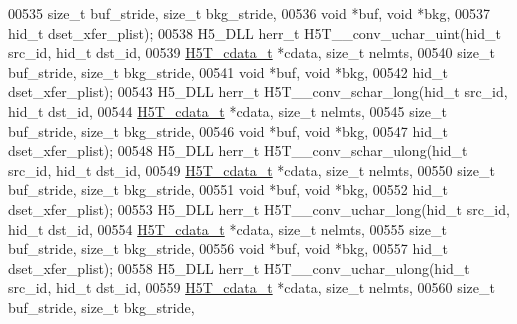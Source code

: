 \begin{DoxyCode}
00535                   \textcolor{keywordtype}{size\_t} buf\_stride, \textcolor{keywordtype}{size\_t} bkg\_stride,
00536                                   \textcolor{keywordtype}{void} *buf, \textcolor{keywordtype}{void} *bkg,
00537                                   hid\_t dset\_xfer\_plist);
00538 H5\_DLL herr\_t H5T\_\_conv\_uchar\_uint(hid\_t src\_id, hid\_t dst\_id,
00539                    \hyperlink{struct_h5_t__cdata__t}{H5T\_cdata\_t} *cdata, \textcolor{keywordtype}{size\_t} nelmts,
00540                    \textcolor{keywordtype}{size\_t} buf\_stride, \textcolor{keywordtype}{size\_t} bkg\_stride,
00541                                    \textcolor{keywordtype}{void} *buf, \textcolor{keywordtype}{void} *bkg,
00542                                    hid\_t dset\_xfer\_plist);
00543 H5\_DLL herr\_t H5T\_\_conv\_schar\_long(hid\_t src\_id, hid\_t dst\_id,
00544                    \hyperlink{struct_h5_t__cdata__t}{H5T\_cdata\_t} *cdata, \textcolor{keywordtype}{size\_t} nelmts,
00545                    \textcolor{keywordtype}{size\_t} buf\_stride, \textcolor{keywordtype}{size\_t} bkg\_stride,
00546                                    \textcolor{keywordtype}{void} *buf, \textcolor{keywordtype}{void} *bkg,
00547                                    hid\_t dset\_xfer\_plist);
00548 H5\_DLL herr\_t H5T\_\_conv\_schar\_ulong(hid\_t src\_id, hid\_t dst\_id,
00549                     \hyperlink{struct_h5_t__cdata__t}{H5T\_cdata\_t} *cdata, \textcolor{keywordtype}{size\_t} nelmts,
00550                     \textcolor{keywordtype}{size\_t} buf\_stride, \textcolor{keywordtype}{size\_t} bkg\_stride,
00551                                     \textcolor{keywordtype}{void} *buf, \textcolor{keywordtype}{void} *bkg,
00552                                     hid\_t dset\_xfer\_plist);
00553 H5\_DLL herr\_t H5T\_\_conv\_uchar\_long(hid\_t src\_id, hid\_t dst\_id,
00554                    \hyperlink{struct_h5_t__cdata__t}{H5T\_cdata\_t} *cdata, \textcolor{keywordtype}{size\_t} nelmts,
00555                    \textcolor{keywordtype}{size\_t} buf\_stride, \textcolor{keywordtype}{size\_t} bkg\_stride,
00556                                    \textcolor{keywordtype}{void} *buf, \textcolor{keywordtype}{void} *bkg,
00557                                    hid\_t dset\_xfer\_plist);
00558 H5\_DLL herr\_t H5T\_\_conv\_uchar\_ulong(hid\_t src\_id, hid\_t dst\_id,
00559                     \hyperlink{struct_h5_t__cdata__t}{H5T\_cdata\_t} *cdata, \textcolor{keywordtype}{size\_t} nelmts,
00560                     \textcolor{keywordtype}{size\_t} buf\_stride, \textcolor{keywordtype}{size\_t} bkg\_stride,

\end{DoxyCode}
